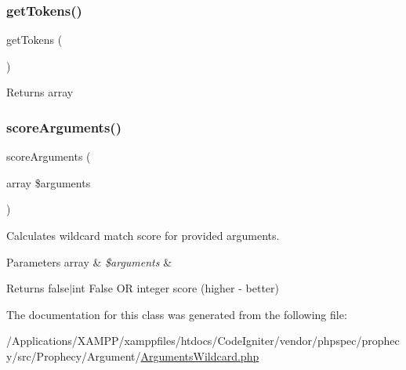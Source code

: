 \subsubsection{\texorpdfstring{get\+Tokens()}{getTokens()}}
{\footnotesize\ttfamily get\+Tokens (\begin{DoxyParamCaption}{ }\end{DoxyParamCaption})}

\begin{DoxyReturn}{Returns}
array 
\end{DoxyReturn}
\mbox{\label{class_prophecy_1_1_argument_1_1_arguments_wildcard_a4d5364b222e55591a19a5b2ca6e61231}} 
\subsubsection{\texorpdfstring{score\+Arguments()}{scoreArguments()}}
{\footnotesize\ttfamily score\+Arguments (\begin{DoxyParamCaption}\item[{array}]{\$arguments }\end{DoxyParamCaption})}

Calculates wildcard match score for provided arguments.


\begin{DoxyParams}[1]{Parameters}
array & {\em \$arguments} & \\
\hline
\end{DoxyParams}
\begin{DoxyReturn}{Returns}
false$\vert$int False OR integer score (higher -\/ better) 
\end{DoxyReturn}


The documentation for this class was generated from the following file\+:\begin{DoxyCompactItemize}
\item 
/\+Applications/\+X\+A\+M\+P\+P/xamppfiles/htdocs/\+Code\+Igniter/vendor/phpspec/prophecy/src/\+Prophecy/\+Argument/\mbox{\hyperlink{_arguments_wildcard_8php}{Arguments\+Wildcard.\+php}}\end{DoxyCompactItemize}
